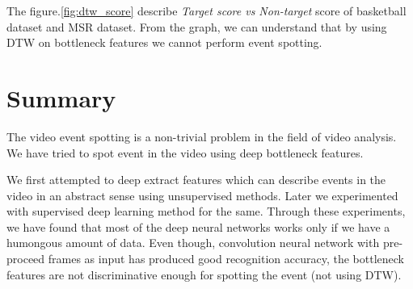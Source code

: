 The figure.\ref{fig:dtw_score} describe \textit{Target score vs Non-target} score of basketball dataset and MSR dataset. From the graph, we can understand that by using DTW on bottleneck features we cannot perform event spotting.

\section{Summary}

The video event spotting is a non-trivial problem in the field of video analysis. We have tried to spot event in the video using deep bottleneck features.

We first attempted to deep extract features which can describe events in the video in an abstract sense using unsupervised methods. Later we experimented with supervised deep learning method for the same. Through these experiments, we have found that most of the deep neural networks works only if we have a humongous amount of data. Even though, convolution neural network with pre-proceed frames as input has produced good recognition accuracy, the bottleneck features are not discriminative enough for spotting the event (not using DTW).